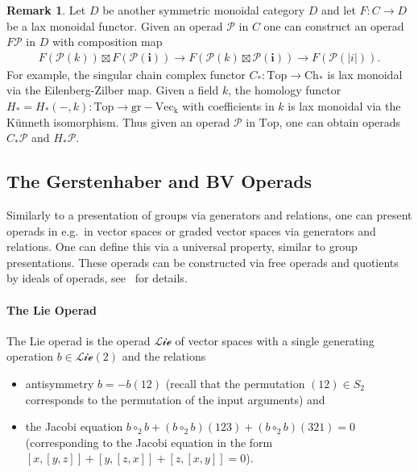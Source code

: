 \documentclass{scrartcl}
\theoremstyle{plain}
\theoremstyle{definition}
\newtheorem{remark}[theorem]{Remark}
\newcommand{\abs}[1]{\left\lvert#1\right\rvert}
\newcommand{\blank}{-}
\newcommand{\comp}{\circ}
\begin{document}
\begin{remark}\label{rmk_operad_functor}
Let $D$ be another symmetric monoidal category $D$ and let $F\colon C\to D$ be a lax monoidal functor. Given an operad $\mathcal P$ in $C$ one can construct an operad $F\mathcal P$ in $D$ with composition map 
\begin{align*}
    F(\mathcal P(k)) \boxtimes F(\mathcal P(\mathbf i)) \to F(\mathcal P(k) \boxtimes \mathcal P(\mathbf i)) \to F(\mathcal P(\abs{i})).
\end{align*}
For example, the singular chain complex functor $C_*\colon \mathrm{Top}\to\mathrm{Ch}_*$ is lax monoidal via the Eilenberg-Zilber map. Given a field $k$, the homology functor $H_* = H_*(\blank, k) \colon \mathrm{Top}\to\mathrm{gr{-}Vec_k}$ with coefficients in $k$ is lax monoidal via the Künneth isomorphism. Thus given an operad $\mathcal P$ in $\mathrm {Top}$, one can obtain operads $C_*\mathcal P$ and $H_*\mathcal P$.
\end{remark}

\subsection*{The Gerstenhaber and BV Operads}
Similarly to a presentation of groups via generators and relations, one can present operads in e.g.\ in vector spaces or graded vector spaces via generators and relations. One can define this via a universal property, similar to group presentations. These operads can be constructed via free operads and quotients by ideals of operads, see~\cite{Maz} for details. 

\paragraph{The Lie Operad} The Lie operad is the operad $\mathcal{Lie}$ of vector spaces with a single generating operation $b\in \mathcal{Lie}(2)$ and the relations \begin{itemize}
    \item antisymmetry $b = -b(12)$ (recall that the permutation $(12)\in S_2$ corresponds to the permutation of the input arguments) and 
    \item the Jacobi equation $b \comp_2 b + (b \comp_2 b)(123) + (b \comp_2 b)(321) = 0$ (corresponding to the Jacobi equation in the form $[x, [y, z]] + [y, [z, x]] + [z, [x, y]] = 0$).
\end{itemize}
\end{document}

